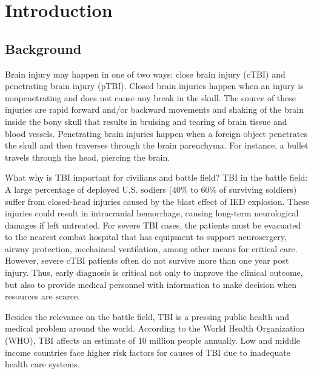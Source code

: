 \documentclass [11pt, proquest] {uwthesis}[2020/02/24]
\begin{document}
\chapter {Introduction}

\section{Background}

Brain injury may happen in one of two ways: close brain injury (cTBI) and penetrating 
brain injury (pTBI)\cite{TBI}. Closed brain injuries happen when an injury is nonpenetrating
and does not cause any break in the skull. The source of these injuries are rapid forward and/or
backward movements and shaking of the brain inside the bony skull that results in bruising
and tearing of brain tissue and blood vessels. Penetrating brain injuries happen when a foreign 
object penetrates the skull and then traverses through the brain parenchyma. 
For instance, a bullet travels through the head, piercing the brain.

What why is TBI important for civilians and battle field?
TBI in the battle field:
A large percentage of deployed U.S. sodiers (40\% to 60\% of surviving soldiers)
suffer from closed-head injuries caused by the blast effect of IED explosion\cite{explosive}. 
These injuries could result in intracranial hemorrhage, causing long-term neurological damages
if left untreated. For severe TBI cases, the patients must be evacuated to the nearest combat
hospital that has equipment to support neurosergery, airway protection, mechaincal ventilation,
among other means for critical care. However, severe cTBI patients often do not survive more than
one year post injury\cite{explosive}. Thus, early diagnosis is critical not only to improve the clinical 
outcome, but also to provide medical personnel with information to make decision when resources are 
scarce.

Besides the relevance on the battle field, TBI is a pressing public health and medical problem
around the world. According to the World Health Organization (WHO), TBI affects an estimate of 10 million 
people annually\cite{hyder_impact_2007}. Low and middle income countries face higher risk factors
for causes of TBI due to inadequate health care systems.
\end{document}

